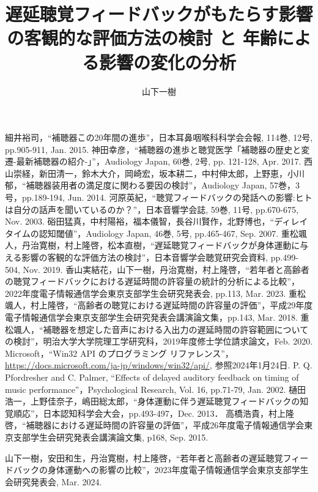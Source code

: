 \documentclass[a4paper,12pt]{jsreport}
\title{遅延聴覚フィードバックがもたらす影響の客観的な評価方法の検討
と
年齢による影響の変化の分析}
\author{山下\hspace{1zw}一樹}%
\begin{document}
\makecover%
\tableofcontents%










\begin{thebibliography}{99}
	細井裕司，``補聴器この20年間の進歩''，日本耳鼻咽喉科科学会会報, 114巻, 12号, pp.905-911, Jan. 2015.
  神田幸彦，``補聴器の進歩と聴覚医学「補聴器の歴史と変遷-最新補聴器の紹介-」''，Audiology Japan, 60巻, 2号, pp. 121-128, Apr. 2017.
  西山崇経，新田清一，鈴木大介，岡崎宏，坂本耕二，中村伸太郎，上野恵，小川郁，``補聴器装用者の満足度に関わる要因の検討''，Audiology Japan, 57巻，3号，pp.189-194, Jun. 2014.
  河原英紀，``聴覚フィードバックの発話への影響:ヒトは自分の話声を聞いているのか？''，日本音響学会誌, 59巻, 11号, pp.670-675, Nov. 2003.
  硲田猛真，中村陽裕，福本儀智，長谷川賢作，北野博也，``ディレイタイムの認知閾値''，Audiology Japan, 46巻, 5号, pp.465-467, Sep. 2007.
  重松颯人，丹治寛樹，村上隆啓，松本直樹，``遅延聴覚フィードバックが身体運動に与える影響の客観的な評価方法の検討''，日本音響学会聴覚研究会資料, pp.499-504, Nov. 2019.
  香山実結花，山下一樹，丹治寛樹，村上隆啓，``若年者と高齢者の聴覚フィードバックにおける遅延時間の許容量の統計的分析による比較''，2022年度電子情報通信学会東京支部学生会研究発表会, pp.113, Mar. 2023.
  重松颯人，村上隆啓，``高齢者の聴覚における遅延時間の許容量の評価''，平成29年度電子情報通信学会東京支部学生会研究発表会講演論文集，pp.143, Mar. 2018.
  重松颯人，``補聴器を想定した音声における入出力の遅延時間の許容範囲についての検討''，明治大学大学院理工学研究科，2019年度修士学位請求論文，Feb. 2020.
  Microsoft，``Win32 API のプログラミング リファレンス''，\url{https://docs.microsoft.com/ja-jp/windows/win32/api/}, 参照2024年1月24日.
  P. Q. Pfordresher and C. Palmer, ``Effects of delayed auditory feedback on timing of music performance''，Psychological Research, Vol. 16, pp.71-79, Jan. 2002.
  樋田浩一，上野佳奈子，嶋田総太郎，``身体運動に伴う遅延聴覚フィードバックの知覚順応''，日本認知科学会大会，pp.493-497，Dec. 2013．
  高橋浩貴，村上隆啓，``補聴器における遅延時間の許容量の評価''，平成26年度電子情報通信学会東京支部学生会研究発表会講演論文集, p168, Sep. 2015.

\end{thebibliography}
\begin{thepublished}{99}
	山下一樹，安田和生，丹治寛樹，村上隆啓，``若年者と高齢者の遅延聴覚フィードバックの身体運動への影響の比較''，2023年度電子情報通信学会東京支部学生会研究発表会, Mar. 2024.
	
\end{thepublished}
\newpage



\appendix




\end{document}
